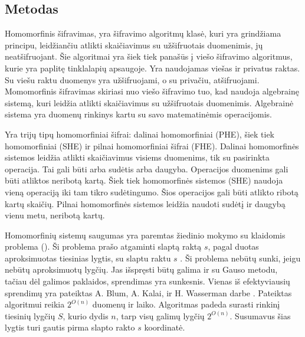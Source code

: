 \documentclass{VUMIFInfBakalaurinis}
\begin{document}
\subsection{Metodas}
\par Homomorfinis šifravimas, yra šifravimo algoritmų klasė, kuri yra grindžiama principu, leidžiančiu atlikti skaičiavimus su užšifruotais duomenimis, jų neatšifruojant. Šie algoritmai yra šiek tiek panašūs į viešo šifravimo algoritmus, kurie yra paplitę tinklalapių apsaugoje. Yra naudojamas viešas ir privatus raktas. Su viešu raktu duomenys yra užšifruojami, o su privačiu, atšifruojami. Momomorfinis šifravimas skiriasi nuo viešo šifravimo tuo, kad naudoja algebrainę sistemą, kuri leidžia atlikti skaičiavimus su užšifruotais duomenimis. \cite{14} Algebrainė sistema yra duomenų rinkinys kartu su savo matematinėmis operacijomis.
\par Yra trijų tipų homomorfiniai šifrai: dalinai homomorfiniai (PHE), šiek tiek homomorfiniai (SHE) ir pilnai homomorfiniai šifrai (FHE). Dalinai homomorfinės sistemos leidžia atlikti skaičiavimus visiems duomenims, tik su pasirinkta operacija. Tai gali būti arba sudėtis arba daugyba.  Operacijos duomenims gali būti atliktos neribotą kartą.  Šiek tiek homomorfinės sistemos (SHE) naudoja vieną operaciją iki tam tikro sudėtingumo. Šios operacijos gali būti atlikto ribotą kartų skaičių. Pilnai homomorfinės sistemos leidžia naudoti sudėtį ir daugybą vienu metu, neribotą kartų. 
\par Homomorfinių sistemų saugumas yra paremtas žiedinio mokymo su klaidomis problema (). Ši problema prašo atgaminti slaptą raktą $s$, pagal duotas aproksimuotas tiesinias lygtis, su slaptu raktu $s$ \cite{16}. Ši problema nebūtų sunki, jeigu nebūtų aproksimuotų lygčių. Jas išspręsti būtų galima ir su Gauso metodu, tačiau dėl galimos paklaidos, sprendimas yra sunkesnis. Vienas iš efektyviausių sprendimų yra pateiktas A. Blum, A. Kalai, ir H. Wasserman darbe \cite{15}. Pateiktas algoritmui reikia $2^{O(n)}$ duomenų ir laiko. Algoritmas padeda surasti rinkinį tiesinių lygčių $S$, kurio dydis $n$, tarp visų galimų lygčių $2^{O(n)}$. Susumavus šias lygtis turi gautis pirma slapto rakto $s$ koordinatė.
\end{document}
